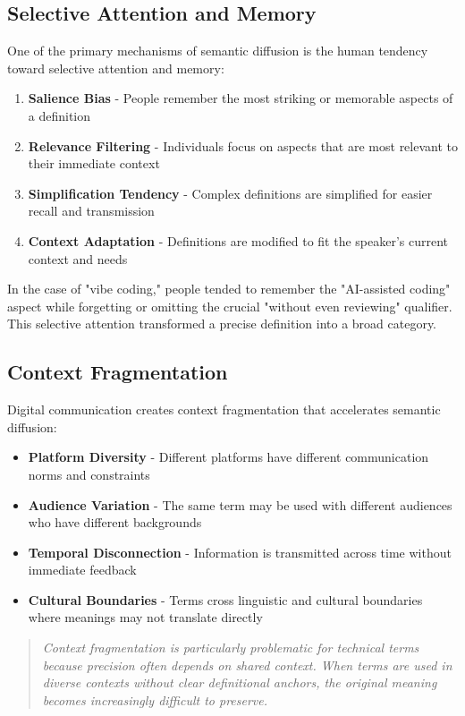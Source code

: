 \documentclass[11pt]{article}
\begin{document}
\subsection{Selective Attention and Memory}

One of the primary mechanisms of semantic diffusion is the human tendency toward selective attention and memory:

\begin{enumerate}
\item \textbf{Salience Bias} - People remember the most striking or memorable aspects of a definition
\item \textbf{Relevance Filtering} - Individuals focus on aspects that are most relevant to their immediate context
\item \textbf{Simplification Tendency} - Complex definitions are simplified for easier recall and transmission
\item \textbf{Context Adaptation} - Definitions are modified to fit the speaker's current context and needs
\end{enumerate}

In the case of "vibe coding," people tended to remember the "AI-assisted coding" aspect while forgetting or omitting the crucial "without even reviewing" qualifier. This selective attention transformed a precise definition into a broad category.

\subsection{Context Fragmentation}

Digital communication creates context fragmentation that accelerates semantic diffusion:

\begin{itemize}
\item \textbf{Platform Diversity} - Different platforms have different communication norms and constraints
\item \textbf{Audience Variation} - The same term may be used with different audiences who have different backgrounds
\item \textbf{Temporal Disconnection} - Information is transmitted across time without immediate feedback
\item \textbf{Cultural Boundaries} - Terms cross linguistic and cultural boundaries where meanings may not translate directly
\end{itemize}

\begin{quote}
\emph{Context fragmentation is particularly problematic for technical terms because precision often depends on shared context. When terms are used in diverse contexts without clear definitional anchors, the original meaning becomes increasingly difficult to preserve.}
\end{quote}
\end{document}
